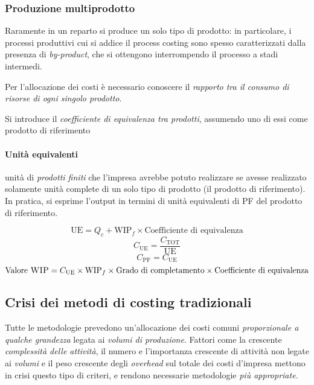\subsubsection{Produzione multiprodotto}
Raramente in un reparto si produce un solo tipo di prodotto: in
particolare, i processi produttivi cui si addice il process costing sono
spesso caratterizzati dalla presenza di \emph{by-product}, che si ottengono
interrompendo il processo a stadi intermedi.

Per l’allocazione dei costi è necessario conoscere il \emph{rapporto tra il
consumo di risorse di ogni singolo prodotto}.

Si introduce il \emph{coefficiente di equivalenza tra prodotti}, assumendo
uno di essi come prodotto di riferimento

\paragraph{Unità equivalenti} unità di \emph{prodotti finiti}
che l’impresa avrebbe potuto realizzare se avesse realizzato
solamente unità complete di un solo tipo di prodotto (il prodotto di
riferimento). In pratica, si esprime l’output in termini di unità
equivalenti di PF del prodotto di riferimento.

\begin{equation*}
    \text{UE} = Q_c + \text{WIP}_f \times \text{Coefficiente di equivalenza}
\end{equation*}
\begin{equation*}
    C_\text{UE} = \frac{C_\text{TOT}}{\text{UE}}
\end{equation*}
\begin{equation*}
    C_\text{PF} = C_\text{UE}
\end{equation*}
\begin{equation*}
    \text{Valore \textsc{WIP}} = C_\text{UE} \times \text{WIP}_f \times \text{Grado di completamento} \times \text{Coefficiente di equivalenza}
\end{equation*}

\subsection{Crisi dei metodi di costing tradizionali}
Tutte le metodologie prevedono un’allocazione dei costi
comuni \emph{proporzionale a qualche grandezza} legata ai \emph{volumi di
produzione}. Fattori come la crescente \emph{complessità delle attività},
il numero e l’importanza crescente di attività non legate ai \emph{volumi} e
il peso crescente degli \emph{overhead} sul totale dei costi d’impresa
mettono in crisi questo tipo di criteri, e rendono necessarie metodologie \emph{più
appropriate}.

